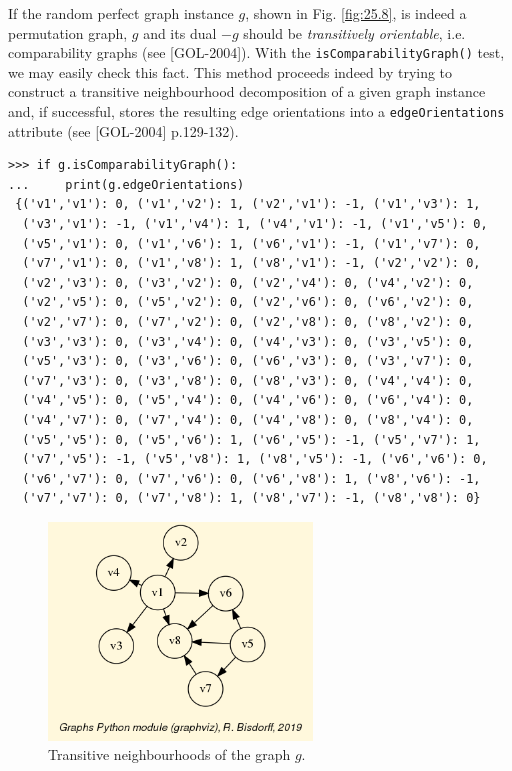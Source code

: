 If the random perfect graph instance $g$, shown in Fig. \ref{fig:25.8}, is indeed a permutation graph, $g$ and its dual $-g$ should be \emph{transitively orientable}, i.e. comparability graphs (see [GOL-2004]). With the \texttt{isComparabilityGraph()} test, we may easily check this fact. This method proceeds indeed by trying to construct a transitive neighbourhood decomposition of a given graph instance and, if successful, stores the resulting edge orientations into a \texttt{edgeOrientations} attribute (see [GOL-2004] p.129-132).
\begin{lstlisting}[basicstyle=\scriptsize]
>>> if g.isComparabilityGraph():
...     print(g.edgeOrientations)  
 {('v1','v1'): 0, ('v1','v2'): 1, ('v2','v1'): -1, ('v1','v3'): 1,
  ('v3','v1'): -1, ('v1','v4'): 1, ('v4','v1'): -1, ('v1','v5'): 0,
  ('v5','v1'): 0, ('v1','v6'): 1, ('v6','v1'): -1, ('v1','v7'): 0,
  ('v7','v1'): 0, ('v1','v8'): 1, ('v8','v1'): -1, ('v2','v2'): 0,
  ('v2','v3'): 0, ('v3','v2'): 0, ('v2','v4'): 0, ('v4','v2'): 0,
  ('v2','v5'): 0, ('v5','v2'): 0, ('v2','v6'): 0, ('v6','v2'): 0,
  ('v2','v7'): 0, ('v7','v2'): 0, ('v2','v8'): 0, ('v8','v2'): 0,
  ('v3','v3'): 0, ('v3','v4'): 0, ('v4','v3'): 0, ('v3','v5'): 0,
  ('v5','v3'): 0, ('v3','v6'): 0, ('v6','v3'): 0, ('v3','v7'): 0,
  ('v7','v3'): 0, ('v3','v8'): 0, ('v8','v3'): 0, ('v4','v4'): 0,
  ('v4','v5'): 0, ('v5','v4'): 0, ('v4','v6'): 0, ('v6','v4'): 0,
  ('v4','v7'): 0, ('v7','v4'): 0, ('v4','v8'): 0, ('v8','v4'): 0,
  ('v5','v5'): 0, ('v5','v6'): 1, ('v6','v5'): -1, ('v5','v7'): 1,
  ('v7','v5'): -1, ('v5','v8'): 1, ('v8','v5'): -1, ('v6','v6'): 0,
  ('v6','v7'): 0, ('v7','v6'): 0, ('v6','v8'): 1, ('v8','v6'): -1,
  ('v7','v7'): 0, ('v7','v8'): 1, ('v8','v7'): -1, ('v8','v8'): 0}
\end{lstlisting}		    
\begin{figure}[h]
\sidecaption
\includegraphics[width=7cm]{Figures/transOrientGraph.png}
\caption{Transitive neighbourhoods of the graph $g$.} 
\label{fig:25.9}       %
\end{figure}

